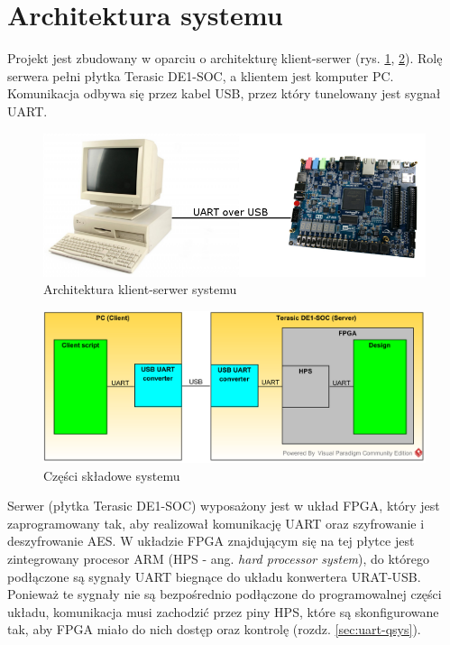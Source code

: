 \section{Architektura systemu}
\label{sec:architektura-systemu}
Projekt jest zbudowany w oparciu o architekturę klient-serwer (rys. \ref{fig:system-architecture-basic}, \ref{fig:system-architecture}). Rolę serwera pełni płytka Terasic DE1-SOC, a klientem jest komputer PC. Komunikacja odbywa się przez kabel USB, przez który tunelowany jest sygnał UART.

\begin{figure}[!h]
\centering
\includegraphics[width=6in]{pictures/system-architecture-basic.png}
\caption{Architektura klient-serwer systemu}
\label{fig:system-architecture-basic}
\end{figure}

\begin{figure}[!h]
\centering
\includegraphics{pictures/system-architecture.png}
\caption{Części składowe systemu}
\label{fig:system-architecture}
\end{figure}

Serwer (płytka Terasic DE1-SOC) wyposażony jest w układ FPGA, który jest zaprogramowany tak, aby realizował komunikację UART oraz szyfrowanie i deszyfrowanie AES. W układzie FPGA znajdującym się na tej płytce jest zintegrowany procesor ARM (HPS - ang. \textit{hard processor system}), do którego podłączone są sygnały UART biegnące do układu konwertera URAT-USB. Ponieważ te sygnały nie są bezpośrednio podłączone do programowalnej części układu, komunikacja musi zachodzić przez piny HPS, które są skonfigurowane tak, aby FPGA miało do nich dostęp oraz kontrolę (rozdz. \ref{sec:uart-qsys}).

